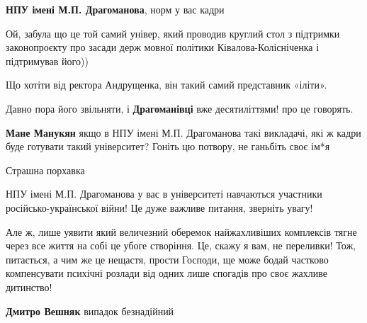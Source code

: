 \begin{itemize}
\textbf{НПУ імені М.П. Драгоманова}, норм у вас кадри 🥴

Ой, забула що це той самий універ, який проводив круглий стол з підтримки
законопроєкту про засади держ мовної політики Ківалова-Колісніченка і
підтримував його))

Що хотіти від ректора Андрущенка, він такий самий представник «іліти».

Давно пора його звільняти, і \textbf{Драгоманівці} вже десятиліттями! про це говорять.

\begin{itemize}

\textbf{Мане Манукян} якщо в НПУ імені М.П. Драгоманова такі викладачі, які ж кадри буде готувати такий університет? Гоніть цю потвору, не ганьбіть своє ім*я
\end{itemize}


Страшна порхавка




НПУ імені М.П. Драгоманова у вас в університеті навчаються участники
російсько-української війни! Це дуже важливе питання, зверніть увагу!




Але ж, лише уявити який величезний оберемок найжахливіших комплексів тягне
через все життя на собі це убоге створіння. Це, скажу я вам, не переливки! Тож,
питається, а чим же це нещастя, прости Господи, ще може бодай частково
компенсувати психічні розлади від одних лише спогадів про своє жахливе
дитинство!

\begin{itemize}

\textbf{Дмитро Вешняк} випадок безнадійний
\end{itemize}



\end{itemize}
